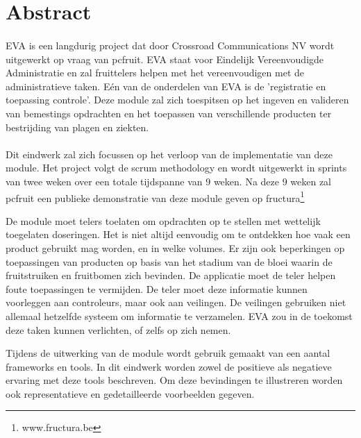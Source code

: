 \section* {Abstract}

\paragraph{}EVA is een langdurig project dat door Crossroad Communications NV wordt uitgewerkt op vraag van pcfruit. EVA staat voor Eindelijk Vereenvoudigde Administratie en zal fruittelers helpen met het vereenvoudigen met de administratieve taken. Eén van de onderdelen van EVA is de 'registratie en toepassing controle'. Deze module zal zich toespitsen op het ingeven en valideren van bemestings opdrachten en het toepassen van verschillende producten ter bestrijding van plagen en ziekten.
\paragraph{}Dit eindwerk zal zich focussen op het verloop van de implementatie van deze module. Het project volgt de scrum methodology en wordt uitgewerkt in sprints van twee weken over een totale tijdspanne van 9 weken. Na deze 9 weken zal pcfruit een publieke demonstratie van deze module geven op fructura\footnote{www.fructura.be}


De module moet telers toelaten om opdrachten op te stellen met wettelijk
toegelaten doseringen. Het is niet altijd eenvoudig om te ontdekken hoe vaak een product
gebruikt mag worden, en in welke volumes. Er zijn ook beperkingen op toepassingen van
producten op basis van het stadium van de bloei waarin de fruitstruiken en fruitbomen
zich bevinden. De applicatie moet de teler helpen foute toepassingen te vermijden.
De teler moet deze informatie kunnen voorleggen aan controleurs, maar ook aan veilingen.
De veilingen gebruiken niet allemaal hetzelfde systeem om informatie te verzamelen. EVA
zou in de toekomst deze taken kunnen verlichten, of zelfs op zich nemen.

Tijdens de uitwerking van de module wordt gebruik gemaakt van een aantal frameworks en
tools. In dit eindwerk worden zowel de positieve als negatieve ervaring met deze tools
beschreven. Om deze bevindingen te illustreren worden ook representatieve en gedetailleerde
voorbeelden gegeven.
